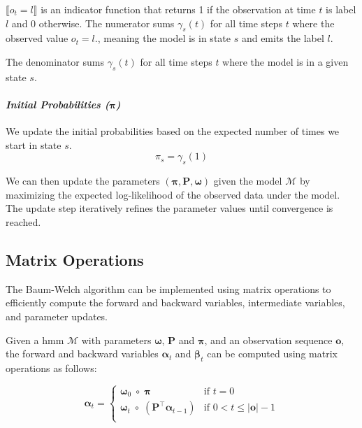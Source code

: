 $\lBrack o_t = l \rBrack$ is an indicator function that returns 1 if the observation at time $t$ is label $l$ and 0 otherwise.
The numerator sums $\gamma_s(t)$ for all time steps $t$ where the observed value $o_t = l$., meaning the model is in state $s$ and emits the label $l$.

The denominator sums $\gamma_s(t)$ for all time steps $t$ where the model is in a given state $s$.


\paragraph*{\textit{Initial Probabilities ($\pmb{\pi}$)}}

We update the initial probabilities based on the expected number of times we start in state $s$.
\begin{equation}
    \pi_s = \gamma_s(1)
    \label{eq:initial-probabilities}
\end{equation}

We can then update the parameters $(\pmb{\pi}, \pmb{P}, \pmb{\omega})$ given the model $\mathcal{M}$ by maximizing the expected log-likelihood of the observed data under the model.
The update step iteratively refines the parameter values until convergence is reached.

\subsection{Matrix Operations}\label{subsec:matrix-operations}
The Baum-Welch algorithm can be implemented using matrix operations to efficiently compute the forward and backward variables, intermediate variables, and parameter updates.

Given a \gls{hmm} $\mathcal{M}$ with parameters $\pmb{\omega}$, $\pmb{P}$ and $\pmb{\pi}$, and an observation sequence $\mathbf{o}$, the forward and backward variables $\pmb{\alpha}_t$ and $\pmb{\beta}_t$ can be computed using matrix operations as follows:

\begin{equation}
    \label{eq:alpha}
    \pmb{\alpha}_t =
    \begin{cases}
        \pmb{\omega}_0 \; \circ \; \pmb{\pi}   & \text{if } t = 0    \\
        \pmb{\omega}_t \; \circ \; \left( \pmb{P}^\top \pmb{\alpha}_{t - 1} \right)   & \text{if } 0 < t \leq |\mathbf{o}|-1 \\
    \end{cases}
\end{equation}


